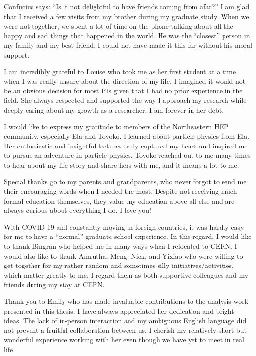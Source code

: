 \begin{acknowledgments}

Confucius says: ``Is it not delightful to have friends coming from afar?'' I am glad that I received a few visits from my brother during my graduate study. When we were not together, we spent a lot of time on the phone talking about all the happy and sad things that happened in the world. He was the ``closest'' person in my family and my best friend. I could not have made it this far without his moral support.

I am incredibly grateful to Louise who took me as her first student at a time when I was really unsure about the direction of my life. I imagined it would not be an obvious decision for most PIs given that I had no prior experience in the field. She always respected and supported the way I approach my research while deeply caring about my growth as a researcher. I am forever in her debt.  

I would like to express my gratitude to members of the Northeastern HEP community, especially Ela and Toyoko. I learned about particle physics from Ela. Her enthusiastic and insightful lectures truly captured my heart and inspired me to pursue an adventure in particle physics. Toyoko reached out to me many times to hear about my life story and share hers with me, and it means a lot to me.

Special thanks go to my parents and grandparents, who never forgot to send me their encouraging words when I needed the most. Despite not receiving much formal education themselves, they value my education above all else and are always curious about everything I do. I love you!

With COVID-19 and constantly moving in foreign countries, it was hardly easy for me to have a ``normal'' graduate school experience. In this regard, I would like to thank Bingran who helped me in many ways when I relocated to CERN. I would also like to thank Amrutha, Meng, Nick, and Yixiao who were willing to get together for my rather random and sometimes silly initiatives/activities, which matter greatly to me. I regard them as both supportive colleagues and my friends during my stay at CERN.

Thank you to Emily who has made invaluable contributions to the analysis work presented in this thesis. I have always appreciated her dedication and bright ideas. The lack of in-person interaction and my ambiguous English language did not prevent a fruitful collaboration between us. I cherish my relatively short but wonderful experience working with her even though we have yet to meet in real life.

\end{acknowledgments}